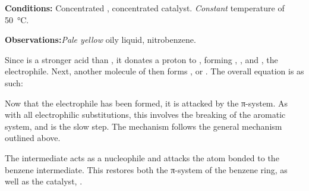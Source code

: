 	\vspace{1.5em}
	\vbox{\textbf{Conditions:}	\tabto{35mm}Concentrated , concentrated  catalyst.
								\tabto{35mm}\textit{Constant} temperature of \SI{50}{\celsius}.}

	\vbox{\textbf{Observations:}\tabto{35mm}\textit{\color{Goldenrod}Pale yellow} oily liquid, nitrobenzene.}


	\vspace{1.5em}

	Since  is a stronger acid than , it donates a proton to , forming , , and , the
	electrophile. Next, another molecule of  then forms , or . The overall equation is as such:



	\vspace{2.0em}

	Now that the electrophile  has been formed, it is attacked by the π-system. As with all electrophilic substitutions, this
	involves the breaking of the aromatic system, and is the slow step. The mechanism follows the general mechanism outlined above.





	\pagebreak

	The  intermediate acts as a nucleophile and attacks the  atom bonded to the benzene intermediate. This
	restores both the π-system of the benzene ring, as well as the catalyst, .


